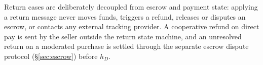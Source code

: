 Return cases are deliberately decoupled from escrow and payment state: applying a return message never moves funds, triggers a refund, releases or disputes an escrow, or contacts any external tracking provider. A cooperative refund on direct pay is sent by the seller outside the return state machine, and an unresolved return on a moderated purchase is settled through the separate escrow dispute protocol (\S\ref{sec:escrow}) before $h_D$.
